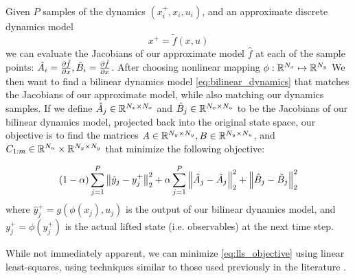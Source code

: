 \documentclass{article}
\begin{document}
  Given $P$ samples of the dynamics $(x_i^+, x_i, u_i)$, and an approximate discrete
  dynamics model 
  \begin{equation}
      x^+ = \tilde{f}(x,u)
  \end{equation}
  we can evaluate the Jacobians of our approximate model $\hat{f}$ at each of the sample
  points: $\tilde{A}_i = \pdv{\tilde{f}}{x}, \tilde{B}_i = \pdv{\tilde{f}}{x}$. After
  choosing nonlinear mapping $\phi : \mathbb{R}^{N_x} \mapsto \mathbb{R}^{N_y}$ We then want to find a
  bilinear dynamics model \eqref{eq:bilinear_dynamics} that matches the Jacobians of our
  approximate model, while also matching our dynamics samples. If we define $\hat{A}_j \in
  \mathbb{R}^{N_x \times N_x}$ and $\hat{B}_j \in \mathbb{R}^{N_x \times N_u}$ to be the Jacobians of our
  bilinear dynamics model, projected back into the original state space, our objective is to
  find the matrices $A \in \mathbb{R}^{N_y \times N_y},B \in \mathbb{R}^{N_y \times N_u}$, and $C_{1:m} \in
  \mathbb{R}^{N_u} \times \mathbb{R}^{N_y \times N_y}$ that minimize the following objective:

  \begin{equation} \label{eq:lls_objective}
      (1- \alpha) \sum_{j=1}^P \norm{\hat{y}_j - y_j^+}_2^2 + 
          \alpha  \sum_{j=1}^P \norm{\hat{A}_j - \tilde{A}_j}_2^2 + 
                               \norm{\hat{B}_j - \tilde{B}_j}_2^2 
  \end{equation}
  where $\hat{y}_j^+ = g\left(\phi(x_j), u_j\right)$ is the output of our bilinear  dynamics
  model, and $y_j^+ = \phi(y_j^+)$ is the actual lifted state (i.e. observables) at the next
  time step.

  While not immediately apparent, we can minimize \eqref{eq:lls_objective} using linear
  least-squares, using techniques similar to those used previously in the literature
  \cite{Folkestad2021}.
\end{document}
